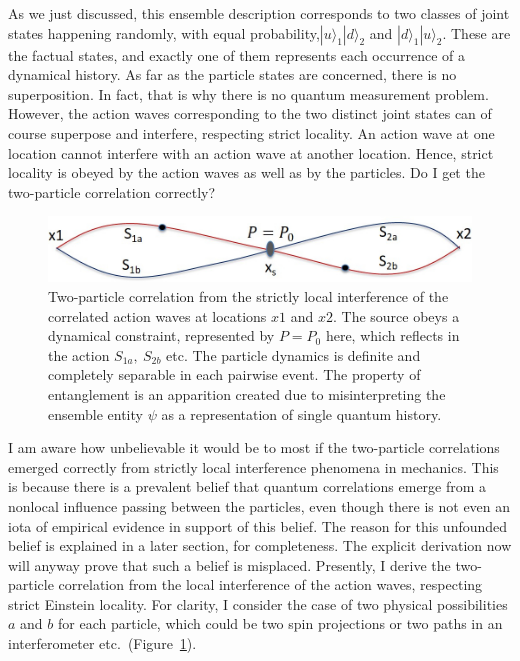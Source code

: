As we just discussed, this ensemble description corresponds to two classes of joint states
happening randomly, with equal probability,\break $|u \rangle_1 |d \rangle_2$ and $|d \rangle_1 |u \rangle_2$. These are the factual
states, and exactly one of them represents each occurrence of a dynamical history. As far
as the particle states are concerned, there is no superposition. In fact, that is why there
is no quantum measurement problem. However, the action waves corresponding to the two
distinct joint states can of course superpose and interfere, respecting strict locality. An
action wave at one location cannot interfere with an action wave at another location. Hence,
strict locality is obeyed by the action waves as well as by the particles. Do I get the two-particle
correlation correctly?
\bigskip

\begin{figure}[tb]
\centering
\includegraphics[scale=0.6]{src/images/chap27/3.jpg}
\smallskip

\caption{Two-particle correlation from the strictly local interference of the correlated action waves at
locations $x1$ and $x2$. The source obeys a dynamical constraint, represented by $P = P_0$ here, which
reflects in the action $S_{1a}, ~S_{2b}$ etc. The particle dynamics is definite and completely separable in
each pairwise event. The property of entanglement is an apparition created due to misinterpreting
the ensemble entity $\psi$ as a representation of single quantum history.}\label{ch14-fig3}
\end{figure}

I am aware how unbelievable it would be to most if the two-particle correlations emerged
correctly from strictly local interference phenomena in mechanics. This is because there is a
prevalent belief that quantum correlations emerge from a nonlocal influence passing between
the particles, even though there is not even an iota of empirical evidence in support of this
belief. The reason for this unfounded belief is explained in a later section, for completeness.
The explicit derivation now will anyway prove that such a belief is misplaced. Presently, I
derive the two-particle correlation from the local interference of the action waves, respecting
strict Einstein locality. For clarity, I consider the case of two physical possibilities $a$ and $b$
for each particle, which could be two spin projections or two paths in an interferometer etc.\ (Figure~\ref{ch14-fig3}).


